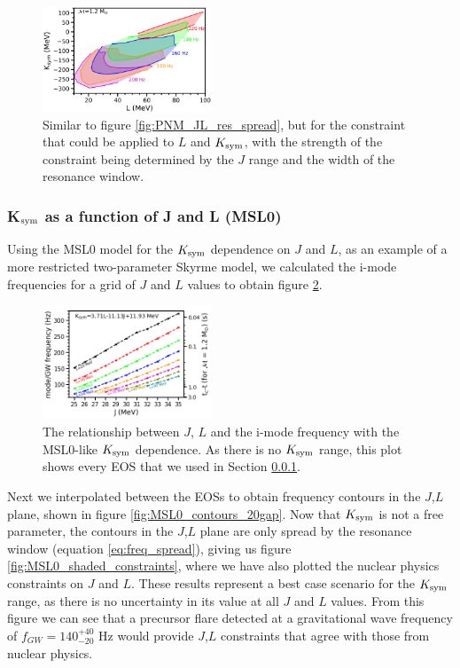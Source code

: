 \documentclass[fleqn,usenatbib]{mnras}
\begin{document}
\begin{figure}
\centering
\includegraphics[width=0.45\textwidth,angle=0]{PNM_LK_Jdfspread.png}
\caption{Similar to figure \ref{fig:PNM_JL_res_spread}, but for the constraint that could be applied to $L$ and $K_{\rm sym}$, with the strength of the constraint being determined by the $J$ range and the width of the resonance window.}
\label{fig:PNM_LK_res_spread}
\end{figure}











\subsubsection{K$_{\rm sym}$ as a function of J and L (MSL0)}\label{subsec4_1_3}
\hspace{\parindent}Using the MSL0 model for the $K_{\rm sym}$ dependence on $J$ and $L$, as an example of a more restricted two-parameter Skyrme model, we calculated the i-mode frequencies for a grid of $J$ and $L$ values to obtain figure \ref{fig:MSL0_J_L_f_tc}.

\begin{figure}
\centering
\includegraphics[width=0.45\textwidth,angle=0]{MSL0_J_L_f_tc}
\caption{The relationship between $J$, $L$ and the i-mode frequency with the MSL0-like $K_{\rm sym}$ dependence. As there is no $K_{\rm sym}$ range, this plot shows every EOS that we used in Section \ref{subsec4_1_3}.}
\label{fig:MSL0_J_L_f_tc}
\end{figure}

Next we interpolated between the EOSs to obtain frequency contours in the $J$,$L$ plane, shown in figure \ref{fig:MSL0_contours_20gap}. Now that $K_{\rm sym}$ is not a free parameter, the contours in the $J$,$L$ plane are only spread by the resonance window (equation \ref{eq:freq_spread}), giving us figure \ref{fig:MSL0_shaded_constraints}, where we have also plotted the nuclear physics constraints on $J$ and $L$. These results represent a best case scenario for the $K_{\rm sym}$ range, as there is no uncertainty in its value at all $J$ and $L$ values. From this figure we can see that a precursor flare detected at a gravitational wave frequency of $f_{GW}=140^{+40}_{-20}$ Hz would provide $J$,$L$ constraints that agree with those from nuclear physics. 
\end{document}
